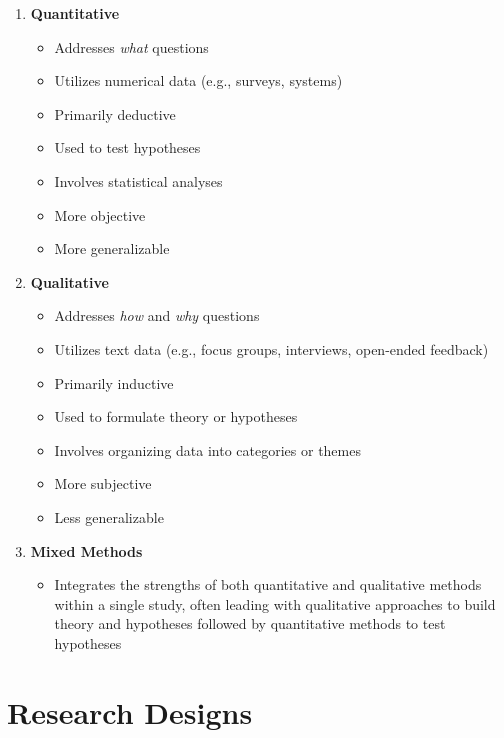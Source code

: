 \documentclass[
]{book}
\providecommand{\tightlist}{%
  \setlength{\itemsep}{0pt}\setlength{\parskip}{0pt}}
\begin{document}
\begin{enumerate}
\def\labelenumi{\arabic{enumi}.}
\tightlist
\item
  \textbf{Quantitative}

  \begin{itemize}
  \tightlist
  \item
    Addresses \emph{what} questions
  \item
    Utilizes numerical data (e.g., surveys, systems)
  \item
    Primarily deductive
  \item
    Used to test hypotheses
  \item
    Involves statistical analyses
  \item
    More objective
  \item
    More generalizable
  \end{itemize}
\item
  \textbf{Qualitative}

  \begin{itemize}
  \tightlist
  \item
    Addresses \emph{how} and \emph{why} questions
  \item
    Utilizes text data (e.g., focus groups, interviews, open-ended feedback)
  \item
    Primarily inductive
  \item
    Used to formulate theory or hypotheses
  \item
    Involves organizing data into categories or themes
  \item
    More subjective
  \item
    Less generalizable
  \end{itemize}
\item
  \textbf{Mixed Methods}

  \begin{itemize}
  \tightlist
  \item
    Integrates the strengths of both quantitative and qualitative methods within a single study, often leading with qualitative approaches to build theory and hypotheses followed by quantitative methods to test hypotheses
  \end{itemize}
\end{enumerate}

\hypertarget{research-designs}{%
\section{Research Designs}\label{research-designs}}
\end{document}
